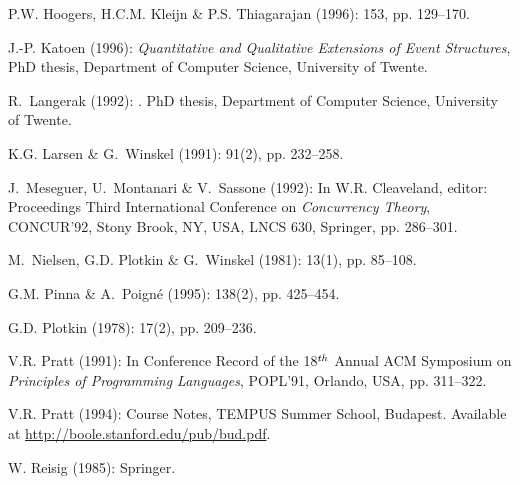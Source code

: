 \documentclass[twocolumn]{article}
\begin{document}
\begin{thebibliography}{10}
{\sc P.W. Hoogers, H.C.M. Kleijn \& P.S. Thiagarajan} (1996):
 153, pp. 129--170.

{\sc J.-P. Katoen} (1996):
{\it Quantitative and Qualitative Extensions of Event Structures},
\newblock PhD thesis, Department of Computer Science, University of Twente.

{\sc R.~Langerak} (1992):
.
\newblock PhD thesis, Department of Computer Science, University of Twente.

{\sc K.G. Larsen \& G.~Winskel} (1991):
 91(2), pp. 232--258.

{\sc J.~Meseguer, U.~Montanari \& V.~Sassone} (1992):
\newblock In W.R. Cleaveland, editor: {Proceedings Third International
Conference on {\sl Concurrency Theory}, CONCUR'92, Stony Brook, NY,
USA}, LNCS 630, Springer, pp. 286--301.

{\sc M.~Nielsen, G.D. Plotkin \& G.~Winskel} (1981):
 13(1), pp. 85--108.

{\sc G.M. Pinna \& A.~Poign\'e} (1995):
 138(2), pp. 425--454.

{\sc G.D. Plotkin} (1978):
 17(2), pp. 209--236.

{\sc V.R. Pratt} (1991):
\newblock In {Conference Record of the 18$^{\it th}$ Annual ACM
Symposium on {\sl Principles of Programming Languages}, POPL'91,
Orlando, USA}, pp. 311--322.

{\sc V.R. Pratt} (1994):
\newblock Course Notes, TEMPUS Summer School, Budapest.
\newblock Available at \url{http://boole.stanford.edu/pub/bud.pdf}.

{\sc W. Reisig} (1985):
\newblock Springer.


\end{thebibliography}
\end{document}

